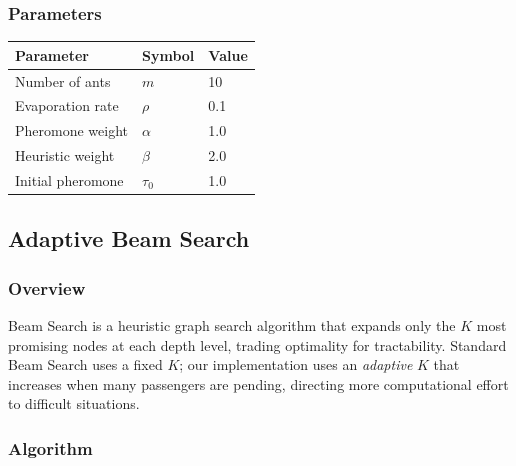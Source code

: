 \documentclass[12pt,a4paper]{article}
\begin{document}
\subsubsection{Parameters}

\begin{center}
\begin{tabular}{lll}
\toprule
\textbf{Parameter} & \textbf{Symbol} & \textbf{Value} \\
\midrule
Number of ants    & $m$   & 10 \\
Evaporation rate  & $\rho$& 0.1 \\
Pheromone weight  & $\alpha$ & 1.0 \\
Heuristic weight  & $\beta$  & 2.0 \\
Initial pheromone & $\tau_0$ & 1.0 \\
\bottomrule
\end{tabular}
\end{center}

\subsection{Adaptive Beam Search}

\subsubsection{Overview}

Beam Search is a heuristic graph search algorithm that expands only the $K$
most promising nodes at each depth level, trading optimality for tractability.
Standard Beam Search uses a fixed $K$; our implementation uses an
\emph{adaptive} $K$ that increases when many passengers are pending,
directing more computational effort to difficult situations.

\subsubsection{Algorithm}
\end{document}
